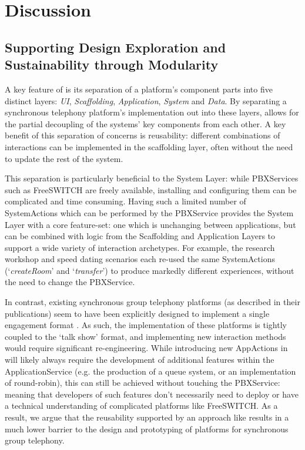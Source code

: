 \section{Discussion}


\subsection{Supporting Design Exploration and Sustainability through Modularity}

A key feature of \ONT{} is its separation of a platform's component parts into five distinct layers: \textit{UI}, \textit{Scaffolding}, \textit{Application}, \textit{System} and \textit{Data}. By separating a synchronous telephony platform's implementation out into these layers, \ONT{} allows for the partial decoupling of the systems' key components from each other. A key benefit of this separation of concerns is reusability: different combinations of interactions can be implemented in the scaffolding layer, often without the need to update the rest of the system.

This separation is particularly beneficial to the System Layer: while PBXServices such as FreeSWITCH are freely available, installing and configuring them can be complicated and time consuming. 
Having such a limited number of SystemActions which can be performed by the PBXService provides the System Layer with a core feature-set: one which is unchanging between applications, but can be combined with logic from the Scaffolding and Application Layers to support a wide variety of interaction archetypes. For example, the research workshop and speed dating scenarios each re-used the same SystemActions (`\textit{createRoom}' and `\textit{transfer}') to produce markedly different experiences, without the need to change the PBXService. 

In contrast, existing synchronous group telephony platforms (as described in their publications) seem to have been explicitly designed to implement a single engagement format \cite{Kazakos2016, Talhouk2017, Yadav2019}. As such, the implementation of these platforms is tightly coupled to the `talk show' format, and implementing new interaction methods would require significant re-engineering.
While introducing new AppActions in \ONT{} will likely always require the development of additional features within the ApplicationService (e.g. the production of a queue system, or an implementation of round-robin), this can still be achieved without touching the PBXService: meaning that developers of such features don't necessarily need to deploy or have a technical understanding of complicated platforms like FreeSWITCH.
As a result, we argue that the reusability supported by an approach like \ONT{} results in a much lower barrier to the design and prototyping of platforms for synchronous group telephony.


